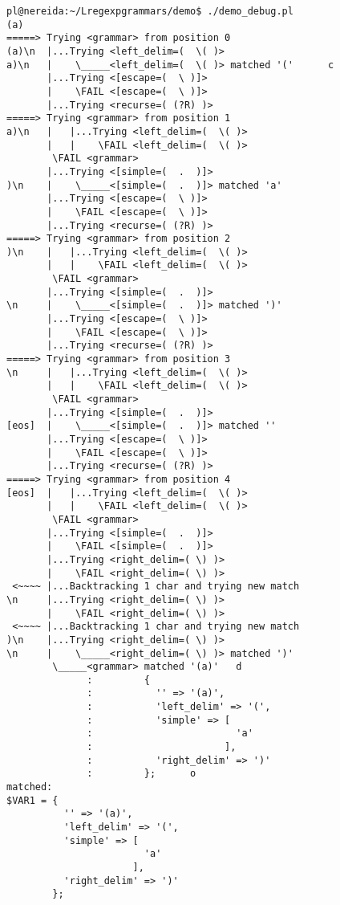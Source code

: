 \begin{latexonly}
\begin{verbatim}
pl@nereida:~/Lregexpgrammars/demo$ ./demo_debug.pl
(a)
=====> Trying <grammar> from position 0
(a)\n  |...Trying <left_delim=(  \( )>
a)\n   |    \_____<left_delim=(  \( )> matched '('      c
       |...Trying <[escape=(  \ )]>
       |    \FAIL <[escape=(  \ )]>
       |...Trying <recurse=( (?R) )>
=====> Trying <grammar> from position 1
a)\n   |   |...Trying <left_delim=(  \( )>
       |   |    \FAIL <left_delim=(  \( )>
        \FAIL <grammar>
       |...Trying <[simple=(  .  )]>
)\n    |    \_____<[simple=(  .  )]> matched 'a'
       |...Trying <[escape=(  \ )]>
       |    \FAIL <[escape=(  \ )]>
       |...Trying <recurse=( (?R) )>
=====> Trying <grammar> from position 2
)\n    |   |...Trying <left_delim=(  \( )>
       |   |    \FAIL <left_delim=(  \( )>
        \FAIL <grammar>
       |...Trying <[simple=(  .  )]>
\n     |    \_____<[simple=(  .  )]> matched ')'
       |...Trying <[escape=(  \ )]>
       |    \FAIL <[escape=(  \ )]>
       |...Trying <recurse=( (?R) )>
=====> Trying <grammar> from position 3
\n     |   |...Trying <left_delim=(  \( )>
       |   |    \FAIL <left_delim=(  \( )>
        \FAIL <grammar>
       |...Trying <[simple=(  .  )]>
[eos]  |    \_____<[simple=(  .  )]> matched ''
       |...Trying <[escape=(  \ )]>
       |    \FAIL <[escape=(  \ )]>
       |...Trying <recurse=( (?R) )>
=====> Trying <grammar> from position 4
[eos]  |   |...Trying <left_delim=(  \( )>
       |   |    \FAIL <left_delim=(  \( )>
        \FAIL <grammar>
       |...Trying <[simple=(  .  )]>
       |    \FAIL <[simple=(  .  )]>
       |...Trying <right_delim=( \) )>
       |    \FAIL <right_delim=( \) )>
 <~~~~ |...Backtracking 1 char and trying new match
\n     |...Trying <right_delim=( \) )>
       |    \FAIL <right_delim=( \) )>
 <~~~~ |...Backtracking 1 char and trying new match
)\n    |...Trying <right_delim=( \) )>
\n     |    \_____<right_delim=( \) )> matched ')'
        \_____<grammar> matched '(a)'   d
              :         {
              :           '' => '(a)',
              :           'left_delim' => '(',
              :           'simple' => [
              :                         'a'
              :                       ],
              :           'right_delim' => ')'
              :         };      o
matched:
$VAR1 = {
          '' => '(a)',
          'left_delim' => '(',
          'simple' => [
                        'a'
                      ],
          'right_delim' => ')'
        };
\end{verbatim}
\end{latexonly}

